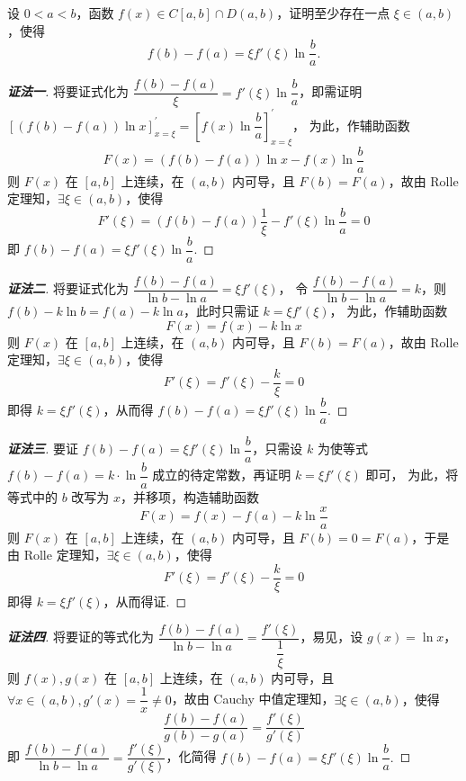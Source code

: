 \begin{example}
    设 $0<a<b$，函数 $f(x)\in C[a,b]\cap D(a,b)$，证明至少存在一点 $\xi\in(a,b)$，使得 $$f(b)-f(a)=\xi f'(\xi)\ln\dfrac{b}{a}.$$
\end{example}
\begin{proof}[{\songti \textbf{证法一}}]
    将要证式化为 $\dfrac{f(b)-f(a)}{\xi}=f'(\xi)\ln\dfrac{b}{a}$，即需证明
    $\left[ \left( f(b)  -f(a)  \right) \ln x\right] _{x=\xi }^{'}=\left[ f(x)  \ln \dfrac{b}{a}\right] _{x=\xi }^{'}$，
    为此，作辅助函数 $$F(x)  =\left( f(b)  -f(a)  \right) \ln x-f(x)  \ln \dfrac{b}{a}$$
    则 $F(x)$ 在 $[a,b]$ 上连续，在 $(a,b)$ 内可导，且 $F(b)=F(a)$，故由 Rolle 定理知，$\exists\xi\in(a,b)\text{，使得 }$
    $$F'(\xi)=(f(b)-f(a))\dfrac{1}{\xi}-f'(\xi)\ln\dfrac{b}{a}=0$$
    即 $f(b)-f(a)=\xi f'(\xi)\ln\dfrac{b}{a}.$
\end{proof}
\begin{proof}[{\songti \textbf{证法二}}]
    将要证式化为 $\dfrac{f(b)  -f(a)  }{\ln b-\ln a}=\xi f'(\xi)  $，
    令 $\dfrac{f(b)  -f(a)  }{\ln b-\ln a}=k$，则 $f(b)-k\ln b=f(a)-k\ln a$，此时只需证 $k=\xi f'(\xi)$，
    为此，作辅助函数 $$F(x)=f(x)-k\ln x$$ 则 $F(x)$ 在 $[a,b]$ 上连续，在 $(a,b)$ 内可导，且 $F(b)=F(a)$，故由 Rolle 定理知，$\exists\xi\in(a,b)\text{，使得 }$
    $$F'(\xi)=f'(\xi)-\dfrac{k}{\xi}=0$$
    即得 $k=\xi f'(\xi)$，从而得 $f(b)-f(a)=\xi f'(\xi)\ln\dfrac{b}{a}.$
\end{proof}
\begin{proof}[{\songti \textbf{证法三}}]
    要证 $f(b)-f(a)=\xi f'(\xi)\ln\dfrac{b}{a}$，只需设 $k$ 为使等式 $f(b)-f(a)=k\cdot\ln\dfrac{b}{a}$ 成立的待定常数，再证明 $k=\xi f'(\xi)$ 即可，
    为此，将等式中的 $b$ 改写为 $x$，并移项，构造辅助函数
    $$F(x)=f(x)-f(a)-k\ln\dfrac{x}{a}$$
    则 $F(x)$ 在 $[a,b]$ 上连续，在 $(a,b)$ 内可导，且 $F(b)=0=F(a)$，于是由 Rolle 定理知，$\exists\xi\in(a,b)\text{，使得 }$
    $$F'(\xi)=f'(\xi)-\dfrac{k}{\xi}=0$$
    即得 $k=\xi f'(\xi)$，从而得证.
\end{proof}
\begin{proof}[{\songti \textbf{证法四}}]
    将要证的等式化为 $\dfrac{f(b)-f(a)}{\ln b-\ln a}=\dfrac{f'(\xi)}{\dfrac{1}{\xi}}$，易见，设 $g(x)=\ln x$，则
    $f(x),g(x)$ 在 $[a,b]$ 上连续，在 $(a,b)$ 内可导，且 $\forall x\in(a,b),g'(x)=\dfrac{1}{x}\neq0$，故由 Cauchy 中值定理知，$\exists\xi\in(a,b)\text{，使得 }$
    $$\dfrac{f(b)-f(a)}{g(b)-g(a)}=\dfrac{f'(\xi)}{g'(\xi)}$$
    即 $\dfrac{f(b)-f(a)}{\ln b-\ln a}=\dfrac{f'(\xi)}{g'(\xi)}$，化简得 $f(b)-f(a)=\xi f'(\xi)\ln\dfrac{b}{a}.$
\end{proof}
